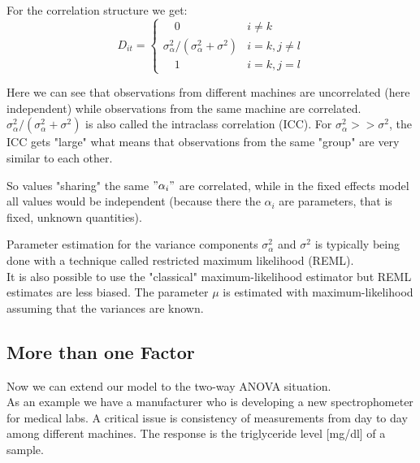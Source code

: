 \documentclass[unknownkeysallowed]{beamer}
\begin{document}
\begin{frame}
	For the correlation structure we get:
	\begin{equation*}
	D_{it} =
	\begin{cases}
	\quad 0 & i \neq k\\
	\sigma^2_{\alpha}/(\sigma^2_{\alpha} + \sigma^2) & i = k, j\neq l\\
	\quad 1 & i=k, j=l
	\end{cases}
	\end{equation*}
	
	Here we can see that observations from different machines are uncorrelated (here independent) while observations from the same machine are correlated. \\
	$\sigma^2_{\alpha}/(\sigma^2_{\alpha} + \sigma^2)$ is also called the intraclass correlation (ICC). For $\sigma^2_{\alpha} >> \sigma^2$, the ICC gets "large" what means that observations from the same "group" are very similar to each other.
	
	So values "sharing" the same $"\alpha_i "$ are correlated, while in the fixed effects model all values would be independent (because there the $\alpha_i$ are parameters, that is fixed, unknown quantities).
\end{frame}

\begin{frame}
	Parameter estimation for the variance components $\sigma^2_{\alpha}$ and $\sigma^2$ is typically being done with a technique called restricted maximum likelihood (REML).\\
	It is also possible to use the "classical" maximum-likelihood estimator but REML estimates are less biased. The parameter $\mu$ is estimated with maximum-likelihood assuming that the variances are known. 
\end{frame}
\subsection{More than one Factor}
\begin{frame}
	Now we can extend our model to the two-way ANOVA situation.\\
	As an example we have a manufacturer who is developing a new spectrophometer for medical labs. A critical issue is consistency of measurements from day to day among different machines. The response is the triglyceride level [mg/dl] of a sample.
\end{frame}
\end{document}
